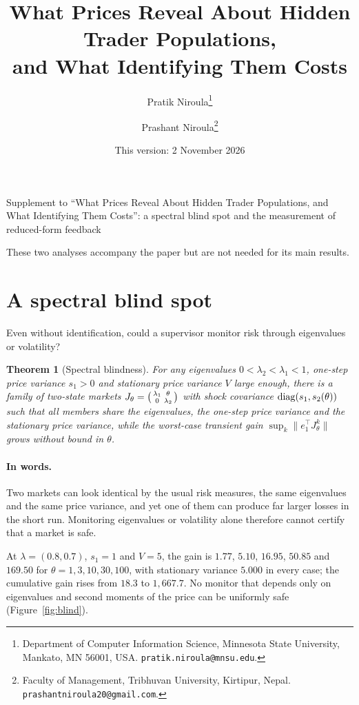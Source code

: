 \documentclass[12pt]{article}
\title{What Prices Reveal About Hidden Trader Populations,\\ and What Identifying Them Costs}
\author{Pratik Niroula\thanks{Department of Computer Information Science, Minnesota State University, Mankato, MN 56001, USA. \texttt{pratik.niroula@mnsu.edu}.}
\and Prashant Niroula\thanks{Faculty of Management, Tribhuvan University, Kirtipur, Nepal. \texttt{prashantniroula20@gmail.com}.}}
\date{This version: 2 November 2026}
\newtheorem{theorem}{Theorem}[section]
\theoremstyle{definition}
\theoremstyle{remark}
\begin{document}
\begin{center}\large Supplement to ``What Prices Reveal About Hidden Trader Populations, and What Identifying Them Costs'': a spectral blind spot and the measurement of reduced-form feedback\end{center}
\renewcommand{\thesection}{S\arabic{section}}\renewcommand{\thetable}{S\arabic{table}}\renewcommand{\thefigure}{S\arabic{figure}}\renewcommand{\theequation}{S\arabic{equation}}
These two analyses accompany the paper but are not needed for its main results.

\section{A spectral blind spot}\label{sec:blind}

Even without identification, could a supervisor monitor risk through eigenvalues or volatility?

\begin{theorem}[Spectral blindness]\label{thm:blind}
For any eigenvalues $0<\lambda_2<\lambda_1<1$, one-step price variance $s_1>0$ and stationary price variance $V$ large enough, there is a family of two-state markets $J_\theta=\begin{psmallmatrix}\lambda_1&\theta\\0&\lambda_2\end{psmallmatrix}$ with shock covariance ${\rm diag}(s_1,s_2(\theta))$ such that all members share the eigenvalues, the one-step price variance and the stationary price variance, while the worst-case transient gain $\sup_k\|e_1^\top J_\theta^k\|$ grows without bound in $\theta$.
\end{theorem}

\paragraph{In words.} Two markets can look identical by the usual risk measures, the same eigenvalues and the same price variance, and yet one of them can produce far larger losses in the short run. Monitoring eigenvalues or volatility alone therefore cannot certify that a market is safe.

At $\lambda=(0.8,0.7)$, $s_1=1$ and $V=5$, the gain is $1.77$, $5.10$, $16.95$, $50.85$ and $169.50$ for $\theta=1,3,10,30,100$, with stationary variance $5.000$ in every case; the cumulative gain rises from $18.3$ to $1{,}667.7$. No monitor that depends only on eigenvalues and second moments of the price can be uniformly safe (Figure~\ref{fig:blind}).
\end{document}
